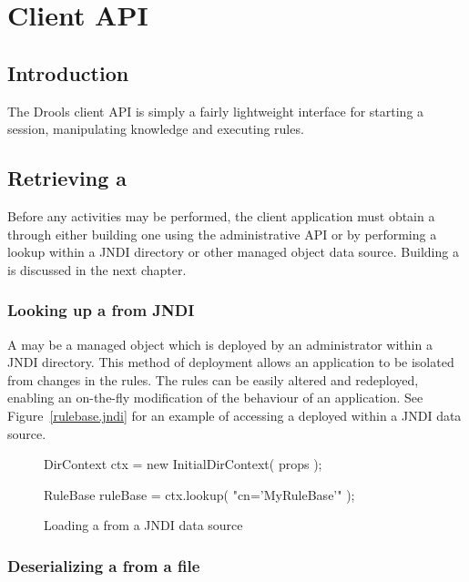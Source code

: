 \chapter{Client API}
\label{client.api}

\section{Introduction}

The Drools client API is simply a fairly lightweight interface for
starting a session, manipulating knowledge and executing rules.

\section{Retrieving a }

Before any activities may be performed, the client application must
obtain a  through either building one using
the administrative API or by performing a lookup within a JNDI
directory or other managed object data source.  Building
a  is discussed in the next chapter.

\subsection{Looking up a  from JNDI}

A  may be a managed object which is deployed
by an administrator within a JNDI directory. This method of deployment
allows an application to be isolated from changes in the rules.  The
rules can be easily altered and redeployed, enabling an on-the-fly
modification of the behaviour of an application.  See
Figure~\vref{rulebase.jndi} for an example of accessing a
 deployed within a JNDI data source.

\begin{figure}
\begin{javaCodelisting}
DirContext ctx = new InitialDirContext( props );

RuleBase ruleBase = ctx.lookup( "cn='MyRuleBase'" );
\end{javaCodelisting}
\caption{Loading a  from a JNDI data source}
\label{rulebase.jndi}
\end{figure}

\subsection{Deserializing a  from a file}

